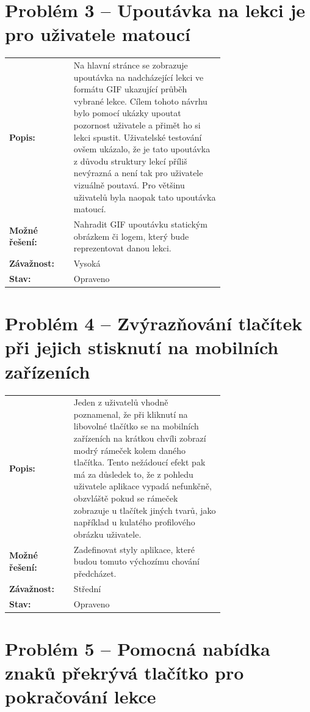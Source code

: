 \section*{Problém 3 – Upoutávka na lekci je pro uživatele matoucí}

\begin{tabular}{lp{0.7\linewidth}}
    \textbf{Popis:} & Na hlavní stránce se zobrazuje upoutávka na nadcházející lekci ve formátu GIF ukazující průběh vybrané lekce. Cílem tohoto návrhu bylo pomocí ukázky upoutat pozornost uživatele a přimět ho si lekci spustit. Uživatelské testování ovšem ukázalo, že je tato upoutávka z důvodu struktury lekcí příliš nevýrazná a není tak pro uživatele vizuálně poutavá. Pro většinu uživatelů byla naopak tato upoutávka matoucí.  \\
    \textbf{Možné řešení:} & Nahradit GIF upoutávku statickým obrázkem či logem, který bude reprezentovat danou lekci. \\
    \textbf{Závažnost:} & Vysoká \\
    \textbf{Stav:} & Opraveno  \\
\end{tabular}

\section*{Problém 4 – Zvýrazňování tlačítek při jejich stisknutí na mobilních zařízeních}

\begin{tabular}{lp{0.7\linewidth}}
    \textbf{Popis:} & Jeden z uživatelů vhodně poznamenal, že při kliknutí na libovolné tlačítko se na mobilních zařízeních na krátkou chvíli zobrazí modrý rámeček kolem daného tlačítka. Tento nežádoucí efekt pak má za důsledek to, že z pohledu uživatele aplikace vypadá nefunkčně, obzvláště pokud se rámeček zobrazuje u tlačítek jiných tvarů, jako například u kulatého profilového obrázku uživatele.  \\
    \textbf{Možné řešení:} & Zadefinovat styly aplikace, které budou tomuto výchozímu chování předcházet. \\
    \textbf{Závažnost:} & Střední \\
    \textbf{Stav:} & Opraveno  \\
\end{tabular}

\section*{Problém 5 – Pomocná nabídka znaků překrývá tlačítko pro pokračování lekce}

